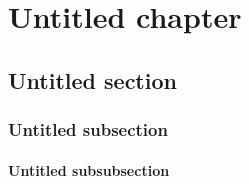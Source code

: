 \documentclass[thesis]{subfiles}
\begin{document}
\chapter{Untitled chapter}
\vspace*{-1\baselineskip}
\section{Untitled section}

\subsection{Untitled subsection}

\subsubsection{Untitled subsubsection}

\OnlyInSubfile{\printglobalbibliography}
\end{document}
